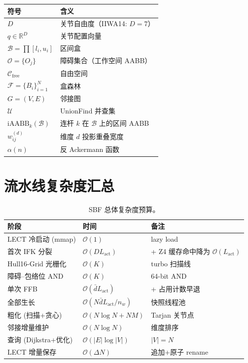 \documentclass[journal]{IEEEtran}
\newcommand{\iAABB}{\mathrm{iAABB}}
\newcommand{\Real}{\mathbb{R}}
\newcommand{\Cfree}{\mathcal{C}_{\mathrm{free}}}
\newcommand{\calO}{\mathcal{O}}
\newcommand{\calF}{\mathcal{F}}
\begin{document}
\begin{table}[ht]
\centering
\small
\begin{tabular}{@{}ll@{}}
\toprule
\textbf{符号} & \textbf{含义} \\
\midrule
$D$ & 关节自由度（IIWA14: $D=7$） \\
$q \in \Real^D$ & 关节配置向量 \\
$\mathcal{B} = \prod [l_i, u_i]$ & 区间盒 \\
$\calO = \{O_j\}$ & 障碍集合（工作空间 AABB） \\
$\Cfree$ & 自由空间 \\
$\calF = \{B_i\}_{i=1}^N$ & 盒森林 \\
$G = (V, E)$ & 邻接图 \\
$\mathcal{U}$ & UnionFind 并查集 \\
$\iAABB_k(\mathcal{B})$ & 连杆 $k$ 在 $\mathcal{B}$ 上的区间 AABB \\
$w_{ij}^{(d)}$ & 维度 $d$ 投影重叠宽度 \\
$\alpha(n)$ & 反 Ackermann 函数 \\
\bottomrule
\end{tabular}
\end{table}

\section{流水线复杂度汇总}\label{app:complexity}

\begin{table}[ht]
\centering
\small
\caption{SBF 总体复杂度预算。}
\label{tab:total_complexity}
\begin{tabular}{@{}lll@{}}
\toprule
\textbf{阶段} & \textbf{时间} & \textbf{备注} \\
\midrule
LECT 冷启动 (mmap)        & $\mathcal{O}(1)$           & lazy load \\
首次 IFK 分裂           & $\mathcal{O}(D L_\text{act})$ & + Z4 缓存命中降为 $\mathcal{O}(L_\text{act})$ \\
Hull16-Grid 光栅化       & $\mathcal{O}(K)$           & turbo 扫描线 \\
障碍--包络位 AND          & $\mathcal{O}(K)$           & 64-bit AND \\
单次 FFB                  & $\mathcal{O}(\bar d L_\text{act})$ & + 占用计数早退 \\
全部生长                  & $\mathcal{O}(N\bar d L_\text{act}/n_w)$ & 快照线程池 \\
粗化 (扫描+贪心)          & $\mathcal{O}(N\log N + N M)$ & Tarjan 关节点 \\
邻接增量维护              & $\mathcal{O}(N\log N)$ & 维度排序 \\
查询 (Dijkstra+优化)      & $\mathcal{O}(|E|\log|V|)$ & $|V|=N$ \\
LECT 增量保存             & $\mathcal{O}(\Delta N)$ & 追加+原子 rename \\
\bottomrule
\end{tabular}
\end{table}
\end{document}
